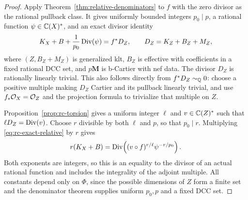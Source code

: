 \begin{proof}
Apply Theorem~\ref{thm:relative-denominators} to $f$ with the zero divisor
as the rational pullback class.  It gives uniformly bounded integers
$p_0\mid p$, a rational function $\psi\in\mathbb C(X)^*$, and an exact divisor
identity
\begin{equation}\label{eq:rc-exact-relative}
 K_X+B+\frac1{p_0}\operatorname{Div}(\psi)=f^*D_Z,
 \qquad D_Z=K_Z+B_Z+M_Z,
\end{equation}
where $(Z,B_Z+M_Z)$ is generalized klt, $B_Z$ is effective with
coefficients in a fixed rational DCC set, and $p\mathbf M$ is b-Cartier
with nef data.  The divisor $D_Z$ is rationally linearly trivial.  This
also follows directly from $f^*D_Z\sim_{\mathbb Q}0$: choose a positive
multiple making $D_Z$ Cartier and its pullback linearly trivial, and use
$f_*\mathcal O_X=\mathcal O_Z$ and the projection formula to trivialize that multiple
on $Z$.

Proposition~\ref{prop:rc-torsion} gives a uniform integer $\ell$ and
$v\in\mathbb C(Z)^*$ such that $\ell D_Z=\operatorname{Div}(v)$.  Choose $r$ divisible by both
$\ell$ and $p$, so that $p_0\mid r$.  Multiplying
\eqref{eq:rc-exact-relative} by $r$ gives
\[
 r(K_X+B)
 =\operatorname{Div}\!\left((v\circ f)^{r/\ell}\psi^{-r/p_0}\right).
\]
Both exponents are integers, so this is an equality to the divisor of an
actual rational function and includes the integrality of the adjoint
multiple.  All constants depend only on $\Phi$, since the possible
dimensions of $Z$ form a finite
set and the denominator theorem supplies uniform $p_0,p$ and a fixed
DCC set.
\end{proof}
